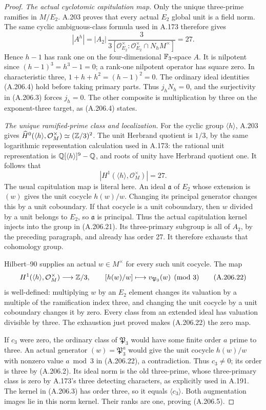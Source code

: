\begin{proof}
\emph{The actual cyclotomic capitulation map.}
Only the unique three-prime ramifies in \(M/E_2\).
A.203 proves that every actual \(E_2\) global unit
is a field norm.  The same cyclic ambiguous-class
formula used in A.173 therefore gives
\[
       |A^h|=|A_2|\,
          \frac{3}{3[\mathcal O_{E_2}^\times:
                \mathcal O_{E_2}^\times\cap N_hM^\times]}
                    =27.
\tag{A.206.20}
\]
Hence \(h-1\) has rank one on the four-dimensional
\(\mathbb F_3\)-space \(A\).  It is nilpotent since
\((h-1)^3=h^3-1=0\); a rank-one nilpotent operator
has square zero.  In characteristic three,
\(1+h+h^2=(h-1)^2=0\).
The ordinary ideal identities (A.206.4) hold before
taking primary parts.  Thus \(j_hN_h=0\), and the
surjectivity in (A.206.3) forces \(j_h=0\).
The other composite is multiplication by three on
the exponent-three target, as (A.206.4) states.

\emph{The unique ramified-prime class and localization.}
For the cyclic group \(\langle h\rangle\), A.203
gives
\(\widehat H^0(\langle h\rangle,\mathcal O_M^\times)
 \simeq(\mathbb Z/3)^2\).
The unit Herbrand quotient is \(1/3\), by the same
logarithmic representation calculation used in A.173:
the rational unit representation is
\(\mathbb Q[\langle h\rangle]^9-\mathbb Q\), and roots of unity
have Herbrand quotient one.  It follows that
\[
       |H^1(\langle h\rangle,\mathcal O_M^\times)|=27.
\tag{A.206.21}
\]
The usual capitulation map is literal here.  An ideal
\(\mathfrak a\) of \(E_2\) whose extension is
\((w)\) gives the unit cocycle \(h(w)/w\).
Changing its principal generator changes this by a
unit coboundary.  If that cocycle is a unit coboundary,
then \(w\) divided by a unit belongs to \(E_2\),
so \(\mathfrak a\) is principal.  Thus the actual
capitulation kernel injects into the group in (A.206.21).
Its three-primary subgroup is all of \(A_2\), by the
preceding paragraph, and already has order 27.  It
therefore exhausts that cohomology group.

Hilbert--90 supplies an actual \(w\in M^\times\)
for every such unit cocycle.  The map
\[
 H^1(\langle h\rangle,\mathcal O_M^\times)
       \longrightarrow\mathbb Z/3,\qquad
 [h(w)/w]\longmapsto v_{\mathfrak P_3}(w)\pmod3
\tag{A.206.22}
\]
is well-defined: multiplying \(w\) by an \(E_2\)
element changes its valuation by a multiple of the
ramification index three, and changing the unit cocycle
by a unit coboundary changes it by zero.  Every class
from an extended ideal has valuation divisible by three.
The exhaustion just proved makes (A.206.22) the zero map.

If \(c_3\) were zero, the ordinary class of
\(\mathfrak P_3\) would have some finite order \(a\)
prime to three.  An actual generator
\((w)=\mathfrak P_3^a\) would give the unit cocycle
\(h(w)/w\) with nonzero value \(a\bmod3\) in
(A.206.22), a contradiction.  Thus \(c_3\ne0\);
its order is three by (A.206.2).
Its ideal norm is the old three-prime, whose
three-primary class is zero by A.173's three detecting
characters, as explicitly used in A.191.
The kernel in (A.206.3) has order three, so it equals
\(\langle c_3\rangle\).
Both augmentation images lie in this norm kernel.
Their ranks are one, proving (A.206.5).


\end{proof}
